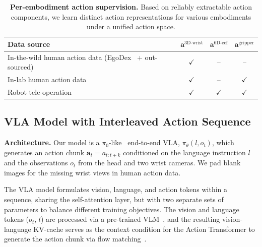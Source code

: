 \documentclass{llmxive}
\providecommand{\myparagraph}[1]{\vspace{0.1em}\noindent\textbf{#1}}
\begin{document}
\begin{table}[htbp]
\centering
\small
\begin{tabular}{l|ccc}
\toprule
Data source & $\mathbf{a}^{\text{3D-wrist}}$ & $\mathbf{a}^{\text{6D-eef}}$ & $\mathbf{a}^{\text{gripper}}$ \\
\midrule
In-the-wild human action data (EgoDex~\cite{hoque2025egodex} + out-sourced) & $\checkmark$ & --           & --           \\
In-lab human action data & $\checkmark$ & --           & $\checkmark$ \\
Robot tele-operation                     & $\checkmark$ & $\checkmark$ & $\checkmark$ \\
\bottomrule
\end{tabular}
\caption{
    \textbf{Per-embodiment action supervision.}
    Based on reliably extractable action components, we learn distinct action representations for various embodiments under a unified action space.
}
\label{method:tab:supervision}
\end{table}





\subsection{VLA Model with Interleaved Action Sequence}
\label{sec:model:model}


\myparagraph{Architecture.}
%
Our model is a $\pi_0$-like~\cite{black2024pi_0,cheang2025gr3} end-to-end VLA, $\pi_\theta(l, o_t)$, which generates an action chunk $\mathbf{a}_t = a_{t:t+k}$ conditioned on the language instruction $l$ and the observations $o_t$ from the head and two wrist cameras.
% 
We pad blank images for the missing wrist views in human action data.



The VLA model formulates vision, language, and action tokens within a sequence, sharing the self-attention layer, but with two separate sets of parameters to balance different training objectives.
% 
The vision and language tokens ($o_t$, $l$) are processed via a pre-trained VLM~\cite{bai2025qwen25vltechnicalreport}, and the resulting vision-language KV-cache serves as the context condition for the Action Transformer to generate the action chunk via flow matching~\cite{liu2022flow,lipman2022flow}.
\end{document}
